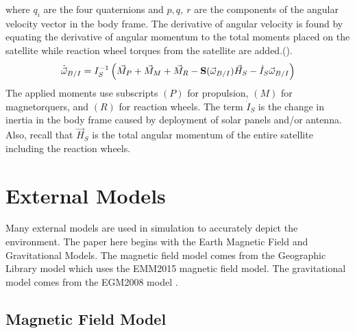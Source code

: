 \documentclass{article}
\begin{document}
where $q_{i}$ are the four quaternions and $p,q,~r$ are the components
of the angular velocity vector in the body frame. The derivative of
angular velocity is found by equating the derivative of angular momentum
to the total moments placed on the satellite while reaction wheel
torques from the satellite are added.(\cite{etkins}).
\begin{equation}\label{e:pqrdot}
  \dot{\vec{\omega}}_{B/I} = I_S^{-1}\left( \vec{M}_P + \vec{M}_{M} +
  \vec{M}_R - {\bf S}(\vec{\omega}_{B/I}) \vec{H}_{S} - \dot{I}_S\vec{\omega}_{B/I}\right)
\end{equation}
The applied moments use subscripts $(P)$ for propulsion, $(M)$ for
magnetorquers, and $(R)$ for reaction wheels. The term $\dot{I}_S$ is the change in
inertia in the body frame caused by deployment of solar panels and/or
antenna. Also, recall that $\vec{H}_S$ is the total angular momentum
of the entire satellite including the reaction wheels.

\section{External Models}

Many external models are used in simulation to accurately depict the
environment. The paper here begins with the Earth Magnetic Field
and Gravitational Models. The magnetic field model comes from the Geographic
Library model which uses the EMM2015 magnetic field model. The
gravitational model comes from the EGM2008 model
\cite{GeographicLib}. 

\subsection{Magnetic Field Model}\label{s:magnetic_field}
\end{document}

